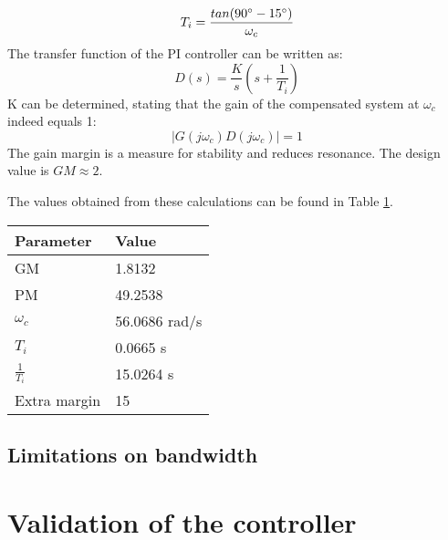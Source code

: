 \documentclass[a4paper,kul]{kulakarticle} %
\begin{document}
\begin{equation}
	\label{eq: Ti}
	T_i = \frac{tan(90\degree - 15\degree)}{\omega_c}
\end{equation} 
The transfer function of the PI controller can be written as:
\begin{equation}
	\label{eq: TF PI}
	D(s) = \frac{K}{s}(s+\frac{1}{T_i})
\end{equation}
K can be determined, stating that the gain of the compensated system at $\omega_c$ indeed equals 1:
\begin{equation}
	|G(j\omega_c)D(j\omega_c)| = 1
\end{equation}
The gain margin is a measure for stability and reduces resonance. The design value is $GM \approx 2$. 

The values obtained from these calculations can be found in Table \ref{tab: values}. 

\begin{table}[htp!]
	\label{tab: values}
	\centering
	\begin{tabular}{|l|l|}
		\hline
		Parameter                & Value                         \\ \hline
		GM                       & 1.8132                        \\
		PM                       & 49.2538\degree \\
		$\omega_c$ & 56.0686 rad/s                 \\
		$T_i $                    & 0.0665 s                      \\
		$\frac{1}{T_i}$                    & 15.0264 s                      \\
		Extra margin             & 15\degree      \\ \hline
	\end{tabular}
\end{table}


\subsection{Limitations on bandwidth}


\section{Validation of the controller}
\end{document}

